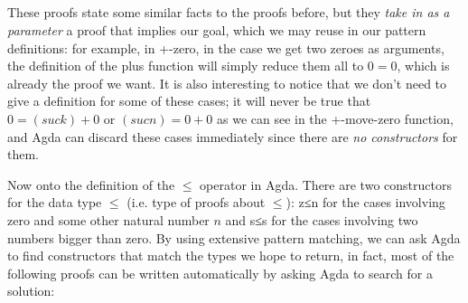 {\begin{code}
\AgdaSpace{}%
\AgdaOperator{\AgdaPrimitive{+}}\AgdaSpace{}%
\<%
\\
\>[0]\AgdaSpace{}%
\AgdaSpace{}%
\AgdaSpace{}%
\AgdaSpace{}%
\AgdaSymbol{=}\AgdaSpace{}%
\<%
\\
\>[0]\AgdaSpace{}%
\AgdaSpace{}%
\AgdaSymbol{(}\AgdaSpace{}%
\AgdaSymbol{)}\AgdaSpace{}%
\AgdaSymbol{()}\<%
\\
\>[0]\AgdaSpace{}%
\AgdaSymbol{(}\AgdaSpace{}%
\AgdaSymbol{)}\AgdaSpace{}%
\AgdaSpace{}%
\AgdaSymbol{()}\<%
\\
\>[0]\AgdaSpace{}%
\AgdaSymbol{(}\AgdaSpace{}%
\AgdaSymbol{)}\AgdaSpace{}%
\AgdaSymbol{(}\AgdaSpace{}%
\AgdaSpace{}%
\AgdaOperator{\AgdaPrimitive{\AgdaDottedPattern{+}}}\AgdaSpace{}%
\AgdaSymbol{\AgdaDottedPattern{)}}\AgdaSymbol{)}\AgdaSpace{}%
\AgdaSpace{}%
\AgdaSymbol{=}\AgdaSpace{}%
\AgdaSpace{}%
\AgdaSpace{}%
\AgdaSymbol{(}\AgdaSpace{}%
\AgdaSpace{}%
\AgdaSymbol{(}\AgdaSpace{}%
\AgdaOperator{\AgdaPrimitive{+}}\AgdaSpace{}%
\AgdaSymbol{)}\AgdaSpace{}%
\AgdaSymbol{)}\<%
\end{code}

These proofs state some similar facts to the proofs before, but they \emph{take in as a parameter} a proof that implies our goal, which we may reuse in our pattern definitions: for example, in +-zero, in the case we get two zeroes as arguments, the definition of the plus function will simply reduce them all to $0 = 0$, which is already the proof we want. It is also interesting to notice that we don't need to give a definition for some of these cases; it will never be true that $0 = (suc k) + 0$ or $(suc n) = 0 + 0$ as we can see in the +-move-zero function, and Agda can discard these cases immediately since there are \emph{no constructors} for them.

Now onto the definition of the $\le$ operator in Agda. There are two constructors for the data type $\le$ (i.e. type of proofs about $\le$): z≤n for the cases involving zero and some other natural number $n$ and s≤s for the cases involving two numbers bigger than zero. By using extensive pattern matching, we can ask Agda to find constructors that match the types we hope to return, in fact, most of the following proofs can be written automatically by asking Agda to search for a solution:

}
